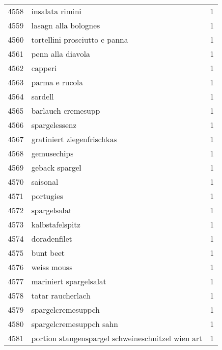\begin{tabular}{llr}
4558 &                                    insalata rimini &      1 \\
4559 &                               lasagn alla bolognes &      1 \\
4560 &                      tortellini prosciutto e panna &      1 \\
4561 &                                  penn alla diavola &      1 \\
4562 &                                            capperi &      1 \\
4563 &                                     parma e rucola &      1 \\
4564 &                                            sardell &      1 \\
4565 &                                 barlauch cremesupp &      1 \\
4566 &                                      spargelessenz &      1 \\
4567 &                         gratiniert ziegenfrischkas &      1 \\
4568 &                                        gemusechips &      1 \\
4569 &                                     geback spargel &      1 \\
4570 &                                           saisonal &      1 \\
4571 &                                          portugies &      1 \\
4572 &                                       spargelsalat &      1 \\
4573 &                                    kalbstafelspitz &      1 \\
4574 &                                       doradenfilet &      1 \\
4575 &                                          bunt beet &      1 \\
4576 &                                        weiss mouss &      1 \\
4577 &                             mariniert spargelsalat &      1 \\
4578 &                                  tatar raucherlach &      1 \\
4579 &                                 spargelcremesuppch &      1 \\
4580 &                            spargelcremesuppch sahn &      1 \\
4581 &  portion stangenspargel schweineschnitzel wien art &      1 \\

\end{tabular}
